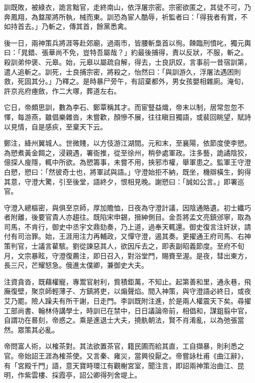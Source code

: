 \begin{pinyinscope}
 訓既敗，被綠衣，詭言黜官，走終南山，依浮屠宗密。宗密欲匿之，其徒不可，乃奔鳳翔，為盩厔將所執，械而東。訓恐為宦人酷辱，祈監者曰：「得我者有賞，不如持首去。」乃斬之，傳其首，餘黨悉禽。



 後一日，兩神策兵將涯等赴郊廟，過兩市，皆腰斬梟首以徇。餗臨刑憤叱，獨元輿曰：「晁錯、張華尚不免，豈特吾屬哉？」約最後捕得，責以反狀，不服，斬之。殺訓弟仲褒、元皋。始，元皋以屬疏自解，得去，士良訊奴，言事前一昔宿訓第，遣人追斬之。訓死，士良捕宗密，將殺之，怡然曰：「與訓游久，浮屠法遇困則救，死固其分。」乃釋之。是時暴尸旁午，有詔棄都外，男女孩嬰相雜廁。淹旬，許京兆府瘞斂，作二大塚，葬道左右。



 它日，帝頗思訓，數為李石、鄭覃稱其才。而宦豎益熾，帝末以制，居常忽忽不懌，每游燕，雖倡樂雜沓，未嘗歡，顏慘不展，往往瞋目獨語，或裴回眺望，賦詩以見情，自是感疢，至棄天下云。



 鄭注，絳州翼城人。世微賤，以方伎游江湖間。元和末，至襄陽，依節度使李愬。為愬煮黃金餌之，浸親遇，署衙推，從至徐州，稍參處軍政。注多藝，詭譎陰狡，億探人廋隱，輒中所欲。為愬籌事，未嘗不用，挾邪市權，舉軍患之。監軍王守澄白愬，愬曰：「然彼奇士也，將軍試與語。」守澄始拒不納，既坐，機辯橫生，鉤得其意，守澄大驚，引至後堂，語終夕，恨相見晚。謝愬曰：「誠如公言。」即署巡官。



 守澄入總樞密，與俱至京師，厚加贍恤，日夜為守澄計議，因陰通賂遺。初士纖巧者附離，後要官貴人亦趨往。既陷宋申錫，搢紳側目。金吾將孟文亮鎮邠寧，取為司馬，不肯行，御史中丞宇文鼎劾奏，乃上道，過奉天輒還。御史復言注奸狀，請付有司治罪。始，王涯用注力再輔政，又憚守澄，遏其奏。更擢通王府司馬、右神策判官，士議言雚駭。劉從諫惡其人，欲因斥去之，即表副昭義節度。至府不旬月，文宗暴眩，守澄復薦注，即日召入，對浴堂門，賜賚至渥。是夜，彗出東方，長三尺，芒耀怒急。俄進太僕卿，兼御史大夫。



 注資貪沓，既藉權寵，專鬻官射利，貲積鉅萬，不知止。起第善和里，通永巷，飛廡復壁，聚京師輕薄子、方鎮將吏，以煽聲焰。間入神策，與守澄語必終日，或夜艾乃罷。險人躁夫有所干謝，日走門。李訓既附注進，於是兩人權震天下矣。尋擢工部尚書、翰林侍講學士，時訓已在禁中，日日議論帝前，相倡和，謀鉏翦中官，自謂功在晷刻，帝惑之。乘是進退士大夫，撓骫朝法，賢不肖淆亂，以為弛張當然。眾策其必亂。



 帝問富人術，以榷茶對。其法欲置茶官，籍民圃而給其直，工自擷暴，則利悉之官。帝始詔王涯為榷茶使。又言秦、雍災，當興役厭之。帝嘗詠杜甫《曲江辭》，有「宮殿千門」語，意天寶時環江有觀榭宮室，聞注言，即詔兩神策治曲江、昆明，作紫雲樓、採霞亭，詔公卿得列舍堤上。




\end{pinyinscope}
